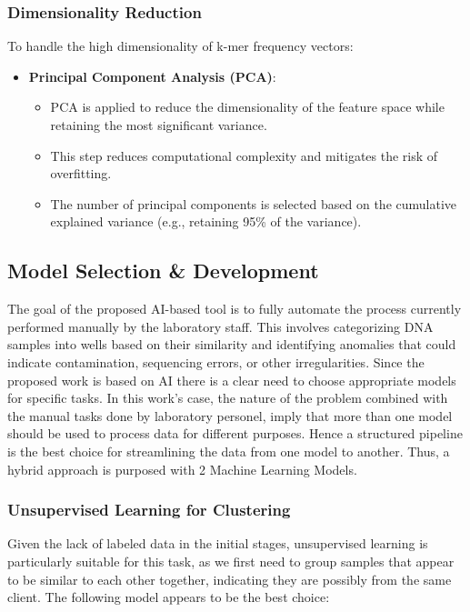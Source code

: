 \subsubsection{Dimensionality Reduction}
To handle the high dimensionality of k-mer frequency vectors:
\begin{itemize}
    \item \textbf{Principal Component Analysis (PCA)}:
    \begin{itemize}
        \item PCA is applied to reduce the dimensionality of the feature space while retaining the most significant variance.
        \item This step reduces computational complexity and mitigates the risk of overfitting.
        \item The number of principal components is selected based on the cumulative explained variance (e.g., retaining 95\% of the variance).
    \end{itemize}
\end{itemize}


\subsection{Model Selection \& Development}

The goal of the proposed AI-based tool is to fully automate the process currently performed manually by the laboratory staff. This involves categorizing DNA samples into wells based on their similarity and identifying anomalies that could indicate contamination, sequencing errors, or other irregularities. Since the proposed work is based on AI there is a clear need to choose appropriate models for specific tasks. 
In this work's case, the nature of the problem combined with the manual tasks done by laboratory personel, imply that more than one model should be used to process data for different purposes. Hence a structured pipeline is the best choice for streamlining the data from one model to another.
Thus, a hybrid approach is purposed with 2 Machine Learning Models.


\subsubsection{Unsupervised Learning for Clustering}
Given the lack of labeled data in the initial stages, unsupervised learning is particularly suitable for this task, as we first need to group samples that appear to be similar to each other together, indicating they are possibly from the same client. The following model appears to be the best choice:

